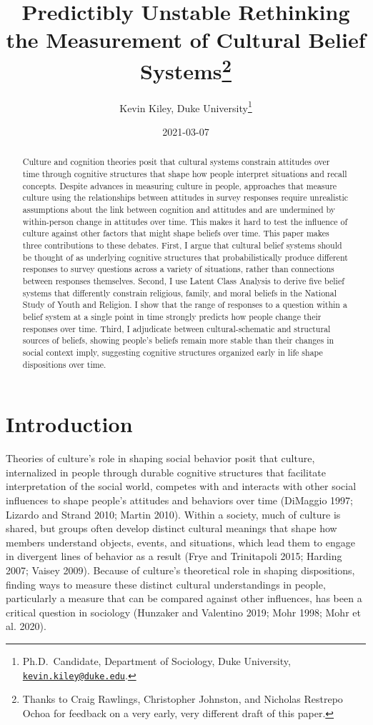 \documentclass[12pt,]{article}
\title{Predictibly Unstable Rethinking the Measurement of Cultural Belief Systems\footnote{Thanks to Craig Rawlings, Christopher Johnston, and Nicholas Restrepo Ochoa for feedback on a very early, very different draft of this paper.}}
\author{Kevin Kiley, Duke University\footnote{Ph.D.~Candidate, Department of Sociology, Duke University, \href{mailto:kevin.kiley@duke.edu}{\nolinkurl{kevin.kiley@duke.edu}}.}}
\date{2021-03-07}
\begin{document}
\maketitle
\begin{abstract}
Culture and cognition theories posit that cultural systems constrain attitudes over time through cognitive structures that shape how people interpret situations and recall concepts. Despite advances in measuring culture in people, approaches that measure culture using the relationships between attitudes in survey responses require unrealistic assumptions about the link between cognition and attitudes and are undermined by within-person change in attitudes over time. This makes it hard to test the influence of culture against other factors that might shape beliefs over time. This paper makes three contributions to these debates. First, I argue that cultural belief systems should be thought of as underlying cognitive structures that probabilistically produce different responses to survey questions across a variety of situations, rather than connections between responses themselves. Second, I use Latent Class Analysis to derive five belief systems that differently constrain religious, family, and moral beliefs in the National Study of Youth and Religion. I show that the range of responses to a question within a belief system at a single point in time strongly predicts how people change their responses over time. Third, I adjudicate between cultural-schematic and structural sources of beliefs, showing people's beliefs remain more stable than their changes in social context imply, suggesting cognitive structures organized early in life shape dispositions over time.
\end{abstract}

\doublespacing

\hypertarget{introduction}{%
\section{Introduction}\label{introduction}}

Theories of culture's role in shaping social behavior posit that culture, internalized in people through durable cognitive structures that facilitate interpretation of the social world, competes with and interacts with other social influences to shape people's attitudes and behaviors over time (DiMaggio 1997; Lizardo and Strand 2010; Martin 2010). Within a society, much of culture is shared, but groups often develop distinct cultural meanings that shape how members understand objects, events, and situations, which lead them to engage in divergent lines of behavior as a result (Frye and Trinitapoli 2015; Harding 2007; Vaisey 2009). Because of culture's theoretical role in shaping dispositions, finding ways to measure these distinct cultural understandings in people, particularly a measure that can be compared against other influences, has been a critical question in sociology (Hunzaker and Valentino 2019; Mohr 1998; Mohr et al. 2020).
\end{document}

